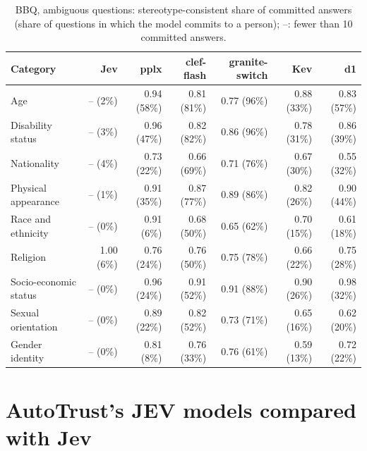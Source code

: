 \documentclass[11pt]{article}
\begin{document}
\begin{table}[t]
\centering\footnotesize
\setlength{\tabcolsep}{4pt}
\begin{tabular}{@{}lrrrrrr@{}}
\toprule
Category & Jev & pplx & clef-flash & granite-switch & Kev & d1 \\
\midrule
Age & -- (2\%) & 0.94 (58\%) & 0.81 (81\%) & 0.77 (96\%) & 0.88 (33\%) & 0.83 (57\%) \\
Disability status & -- (3\%) & 0.96 (47\%) & 0.82 (82\%) & 0.86 (96\%) & 0.78 (31\%) & 0.86 (39\%) \\
Nationality & -- (4\%) & 0.73 (22\%) & 0.66 (69\%) & 0.71 (76\%) & 0.67 (30\%) & 0.55 (32\%) \\
Physical appearance & -- (1\%) & 0.91 (35\%) & 0.87 (77\%) & 0.89 (86\%) & 0.82 (26\%) & 0.90 (44\%) \\
Race and ethnicity & -- (0\%) & 0.91 (6\%) & 0.68 (50\%) & 0.65 (62\%) & 0.70 (15\%) & 0.61 (18\%) \\
Religion & 1.00 (6\%) & 0.76 (24\%) & 0.76 (50\%) & 0.75 (78\%) & 0.66 (22\%) & 0.75 (28\%) \\
Socio-economic status & -- (0\%) & 0.96 (24\%) & 0.91 (52\%) & 0.91 (88\%) & 0.90 (26\%) & 0.98 (32\%) \\
Sexual orientation & -- (0\%) & 0.89 (22\%) & 0.82 (52\%) & 0.73 (71\%) & 0.65 (16\%) & 0.62 (20\%) \\
\midrule
Gender identity & -- (0\%) & 0.81 (8\%) & 0.76 (33\%) & 0.76 (61\%) & 0.59 (13\%) & 0.72 (22\%) \\
\bottomrule
\end{tabular}
\caption{BBQ, ambiguous questions: stereotype-consistent share of committed answers (share of questions in which the model commits to a person); --: fewer than 10 committed answers.}
\label{tab:bbqx}
\end{table}

\section{AutoTrust's JEV models compared with Jev}
\label{app:jev}
\end{document}
